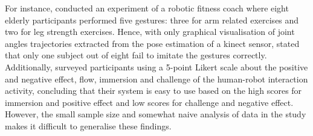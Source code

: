 For instance, \cite{gorer2013} conducted an experiment of a robotic 
fitness coach 
where eight elderly participants performed five gestures: 
three for arm related exercises and two for leg strength exercises. 
Hence, \cite{gorer2013} with only graphical 
visualisation of joint angles trajectories extracted from the pose estimation
of a kinect sensor, 
stated that only one subject out of eight fail to imitate the gestures 
correctly.
Additionally,
\cite{gorer2013} surveyed 
participants using a 5-point Likert scale about the positive and 
negative effect, flow, immersion and challenge of the human-robot 
interaction activity, concluding that their system is easy to use 
based on the high scores for immersion and 
positive effect and low scores for challenge and negative effect.
However, the small sample size and somewhat naive analysis of data
in the study makes it difficult to generalise these findings.


